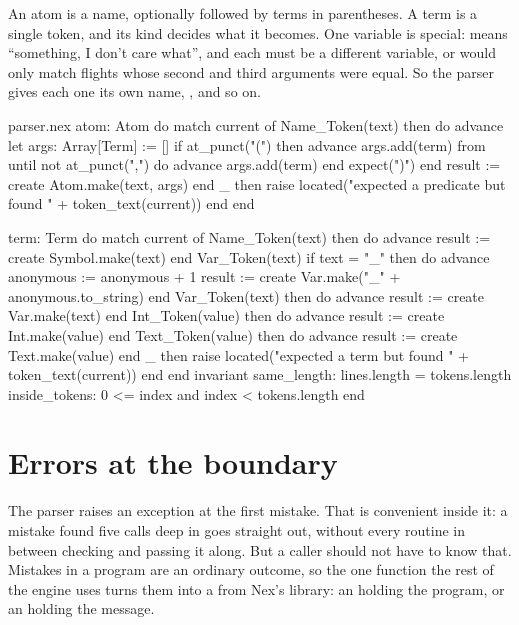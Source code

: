 An atom is a name, optionally followed by terms in parentheses. A term is a
single token, and its kind decides what it becomes. One variable is special:
\code{_} means ``something, I don't care what'', and each \code{_} must be
a different variable, or  would only match flights
whose second and third arguments were equal. So the parser gives each one
its own name, ,  and so on.

\begin{continued}{parser.nex}
  atom: Atom
  do
    match current of
      Name_Token(text) then
        do
          advance
          let args: Array[Term] := []
          if at_punct("(") then
            advance
            args.add(term)
            from until not at_punct(",") do
              advance
              args.add(term)
            end
            expect(")")
          end
          result := create Atom.make(text, args)
        end
      _ then raise located("expected a predicate but found " + token_text(current))
    end
  end

  term: Term
  do
    match current of
      Name_Token(text) then
        do
          advance
          result := create Symbol.make(text)
        end
      Var_Token(text) if text = "_" then
        do
          advance
          anonymous := anonymous + 1
          result := create Var.make("_" + anonymous.to_string)
        end
      Var_Token(text) then
        do
          advance
          result := create Var.make(text)
        end
      Int_Token(value) then
        do
          advance
          result := create Int.make(value)
        end
      Text_Token(value) then
        do
          advance
          result := create Text.make(value)
        end
      _ then raise located("expected a term but found " + token_text(current))
    end
  end
invariant
  same_length: lines.length = tokens.length
  inside_tokens: 0 <= index and index < tokens.length
end
\end{continued}

\section{Errors at the boundary}

The parser raises an exception at the first mistake. That is convenient
inside it: a mistake found five calls deep in  goes straight
out, without every routine in between checking and passing it along. But a
caller should not have to know that. Mistakes in a program are an ordinary
outcome, so the one function the rest of the engine uses turns them into a
 from Nex's  library: an  holding
the program, or an  holding the message.


